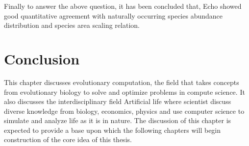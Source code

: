 Finally to answer the above question, it has been concluded that, Echo showed good quantitative agreement with naturally occurring species abundance distribution and species area scaling relation.

\section{Conclusion}
This chapter discusses evolutionary computation, the field that takes concepts from evolutionary biology to solve and optimize problems in compute science. It also discusses the interdisciplinary field Artificial life where scientist discuss diverse knowledge from biology, economics, physics and use computer science to simulate and analyze life as it is in nature. The discussion of this chapter is expected to provide a base upon which the following chapters will begin construction of the core idea of this thesis. 